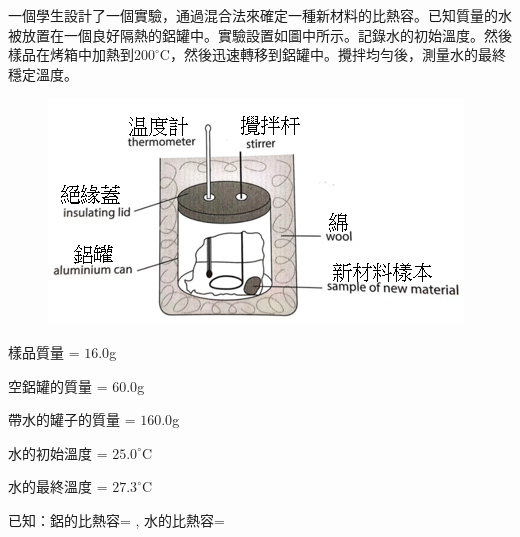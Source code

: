 {
    一個學生設計了一個實驗，通過混合法來確定一種新材料的比熱容。已知質量的水被放置在一個良好隔熱的鋁罐中。實驗設置如圖中所示。記錄水的初始溫度。然後樣品在烤箱中加熱到$200^{\circ}$C，然後迅速轉移到鋁罐中。攪拌均勻後，測量水的最終穩定溫度。
    \begin{figure}[h]
        \centering
        \includegraphics[width=0.5\linewidth]{assets/Screenshot_9.png}
    \end{figure}
    \par 樣品質量 = $16.0$g
    \par 空鋁罐的質量 = $60.0$g
    \par 帶水的罐子的質量 = $160.0$g
    \par 水的初始溫度 = $25.0^\circ$C
    \par 水的最終溫度 = $27.3^{\circ}$C
    \par \medskip  已知：鋁的比熱容= , 水的比熱容= 
    }
